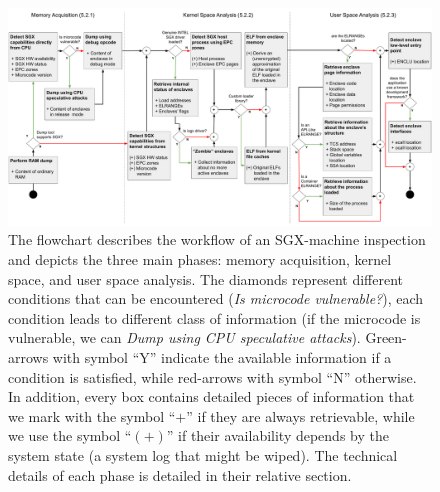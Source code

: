 \begin{figure}
	\centering
	\includegraphics[width=\linewidth]{fig_c8/final_schema_sgx.pdf}
	\caption[Flowchart for memory forensic analysis in an SGX-machine.]
		{The flowchart describes the workflow of an SGX-machine inspection 
		and depicts the three main phases: memory acquisition, kernel space, 
		and user space analysis.
		The diamonds represent different conditions that can be encountered 
		(\eg \emph{Is microcode vulnerable?}), each condition leads to 		
		different class of information (\eg if the microcode is vulnerable, we 
		can \emph{Dump using CPU speculative attacks}). Green-arrows with 
		symbol ``Y'' indicate the available information if a condition is 
		satisfied, while red-arrows with symbol ``N'' otherwise.
		In addition, every box contains detailed pieces of information that we 
		mark with the symbol ``$+$'' if they are always retrievable, while we 
		use the symbol ``$(+)$'' if their availability depends by the system 
		state (\eg a system log that might be wiped). 
		The technical details of each phase is detailed in their relative 
		section.}
	\label{fig:analysis-map}
\end{figure}


